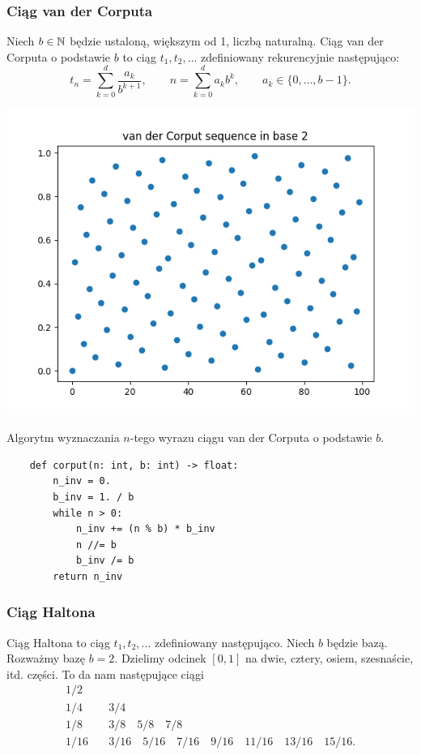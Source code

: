 \documentclass[a4paper,12pt]{article}
\begin{document}
\subsubsection*{Ciąg van der Corputa}

Niech $b \in \mathbb{N}$ będzie ustaloną, większym od 1, liczbą naturalną.
Ciąg van der Corputa o podstawie $b$ to ciąg $t_1, t_2, \dots$ zdefiniowany
rekurencyjnie następująco:
$$
    t_n = \sum_{k=0}^{d} \frac{a_k}{b^{k+1}}, \qquad n = \sum_{k=0}^{d} a_k b^k, \qquad a_k \in \{0, \dots, b-1\}.
$$

\begin{multicols*}{2}
    \includegraphics[scale=0.5]{img/corput.png}

    \columnbreak

    Algorytm wyznaczania $n$-tego wyrazu ciągu van der Corputa o podstawie $b$.
    \begin{lstlisting}
    def corput(n: int, b: int) -> float:
        n_inv = 0.
        b_inv = 1. / b
        while n > 0:
            n_inv += (n % b) * b_inv
            n //= b
            b_inv /= b
        return n_inv
    \end{lstlisting}
\end{multicols*}

\subsubsection*{Ciąg Haltona}

Ciąg Haltona to ciąg $t_1, t_2, \dots$ zdefiniowany następująco.
Niech $b$ będzie bazą. Rozważmy bazę $b = 2$. Dzielimy odcinek $[0, 1]$ na dwie,
cztery, osiem, szesnaście, itd. części. To da nam następujące ciągi
\begin{align*}
    1/2  & \quad                                                                            \\
    1/4  & \quad 3/4                                                                        \\
    1/8  & \quad 3/8 \quad 5/8 \quad 7/8                                                    \\
    1/16 & \quad 3/16 \quad 5/16 \quad 7/16 \quad 9/16 \quad 11/16 \quad 13/16 \quad 15/16.
\end{align*}
\end{document}
